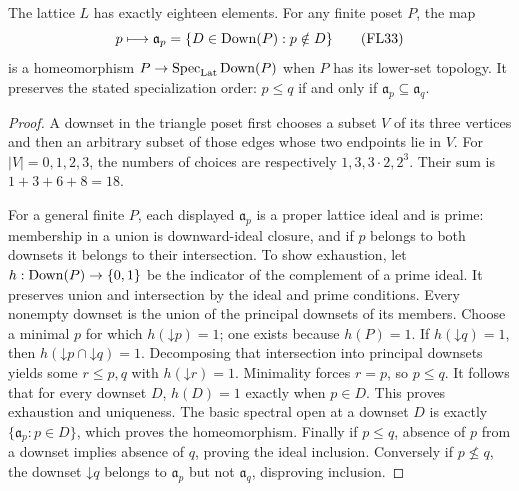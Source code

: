 \begin{proposition}
\label{FL:prop:triangle-lattice}
The lattice $L$ has exactly eighteen elements. For any finite poset
$P$, the map
\[
 p\longmapsto\mathfrak a_p=\{D\in\operatorname{Down}(P):p\notin D\}
 \tag{FL33}\label{FL:eq:poset-primes}
\]
is a homeomorphism $P\to\operatorname{Spec}_{\rm Lat}\operatorname{Down}(P)$ when $P$ has its lower-set
topology. It preserves the stated specialization order: $p\le q$
if and only if $\mathfrak a_p\subseteq\mathfrak a_q$.
\end{proposition}
\begin{proof}
A downset in the triangle poset first chooses a subset $V$ of its
three vertices and then an arbitrary subset of those edges whose
two endpoints lie in $V$. For $|V|=0,1,2,3$, the numbers of choices
are respectively $1,3,3\cdot2,2^3$. Their sum is
$1+3+6+8=18$.

For a general finite $P$, each displayed $\mathfrak a_p$ is a proper
lattice ideal and is prime: membership in a union is downward-ideal
closure, and if $p$ belongs to both downsets it belongs to their
intersection. To show exhaustion, let $h:\operatorname{Down}(P)\to\{0,1\}$ be the
indicator of the complement of a prime ideal. It preserves union
and intersection by the ideal and prime conditions. Every nonempty
downset is the union of the principal downsets of its members.
Choose a minimal $p$ for which $h(\mathord\downarrow p)=1$; one exists
because $h(P)=1$. If $h(\mathord\downarrow q)=1$, then
$h(\mathord\downarrow p\cap\mathord\downarrow q)=1$. Decomposing that
intersection into principal downsets yields some $r\le p,q$ with
$h(\mathord\downarrow r)=1$. Minimality forces $r=p$, so $p\le q$.
It follows that for every downset $D$, $h(D)=1$ exactly when $p\in D$.
This proves exhaustion and uniqueness. The basic spectral open at a
downset $D$ is exactly $\{\mathfrak a_p:p\in D\}$, which proves the
homeomorphism. Finally if $p\le q$, absence of $p$ from a downset
implies absence of $q$, proving the ideal inclusion. Conversely if
$p\not\le q$, the downset $\mathord\downarrow q$ belongs to
$\mathfrak a_p$ but not $\mathfrak a_q$, disproving inclusion.
\end{proof}

